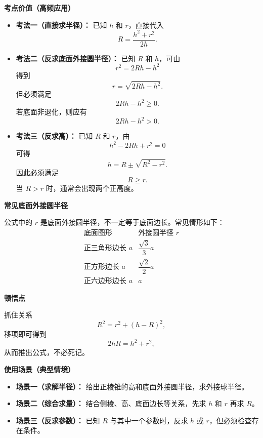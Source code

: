 \begin{explanationbox}
	\medskip
	\textbf{\textcolor{CExplanation}{考点价值（高频应用）}}
	\begin{itemize}[leftmargin=*, itemsep=0.5em, topsep=0.4em]
		\item \textbf{考法一（直接求半径）：} 已知 $h$ 和 $r$，直接代入
		      \[
			      R=\frac{h^2+r^2}{2h}.
		      \]
		\item \textbf{考法二（反求底面外接圆半径）：} 已知 $R$ 和 $h$，可由
		      \[
			      r^2=2Rh-h^2
		      \]
		      得到
		      \[
			      r=\sqrt{2Rh-h^2}.
		      \]
		      但必须满足
		      \[
			      2Rh-h^2\ge 0.
		      \]
		      若底面非退化，则应有
		      \[
			      2Rh-h^2>0.
		      \]
		\item \textbf{考法三（反求高）：} 已知 $R$ 和 $r$，由
		      \[
			      h^2-2Rh+r^2=0
		      \]
		      可得
		      \[
			      h=R\pm\sqrt{R^2-r^2}.
		      \]
		      因此必须满足
		      \[
			      R\ge r.
		      \]
		      当 $R>r$ 时，通常会出现两个正高度。
	\end{itemize}

	\medskip
	\textbf{\textcolor{CExplanation}{常见底面外接圆半径}}

	公式中的 $r$ 是底面外接圆半径，不一定等于底面边长。常见情形如下：
	\[
		\begin{array}{c|c}
			\text{底面图形}      & \text{外接圆半径 } r    \\ \hline
			\text{正三角形边长 } a & \dfrac{\sqrt3}{3}a \\[6pt]
			\text{正方形边长 } a  & \dfrac{\sqrt2}{2}a \\[6pt]
			\text{正六边形边长 } a & a
		\end{array}
	\]

	\medskip
	\textbf{\textcolor{CExplanation}{顿悟点}}

	抓住关系
	\[
		R^2=r^2+(h-R)^2,
	\]
	移项即可得到
	\[
		2hR=h^2+r^2,
	\]
	从而推出公式，不必死记。

	\medskip
	\textbf{\textcolor{CExplanation}{使用场景（典型情境）}}
	\begin{itemize}[leftmargin=*, itemsep=0.5em, topsep=0.4em]
		\item \textbf{场景一（求解半径）：} 给出正棱锥的高和底面外接圆半径，求外接球半径。
		\item \textbf{场景二（综合求量）：} 结合侧棱、高、底面边长等关系，先求 $h$ 和 $r$ 再求 $R$。
		\item \textbf{场景三（反求参数）：} 已知 $R$ 与其中一个参数时，反求 $h$ 或 $r$，但必须检查存在条件。
	\end{itemize}

\end{explanationbox}